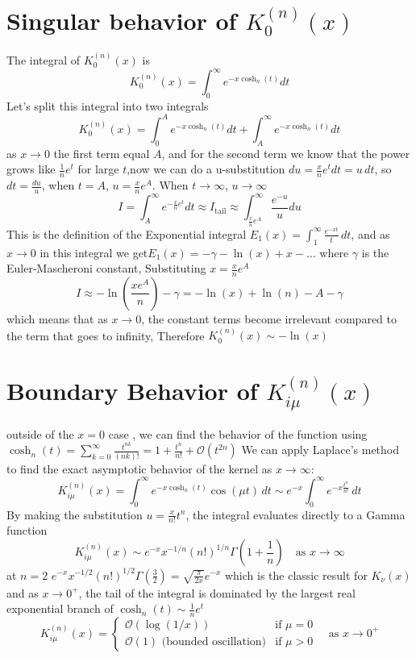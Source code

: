 \documentclass{article}
\newcommand{\NotDefinedcosh}[2]{\operatorname{cosh}_{#1}\text{#2}}
\begin{document}
\section{Singular behavior of $K_0^{(n)}(x)$}
The integral of $K^{(n)}_{0}(x)$ is
\[K^{(n)}_{0}(x) = \int_{0}^{\infty}e^{-x\NotDefinedcosh{n}{}(t)}dt\]
Let's split this integral into two integrals
\[K^{(n)}_{0}(x) = \int_{0}^{A}e^{-x\NotDefinedcosh{n}{}(t)}dt+\int_{A}^{\infty}e^{-x\NotDefinedcosh{n}{}(t)}dt\]
as $x\to 0$ the first term equal $A$, and for the second term we know that the power grows like $\frac{1}{n}e^t$ for large $t$,now we can do a u-substitution $du = \frac{x}{n} e^t dt = u \, dt$, so $dt = \frac{du}{u}$, when $t=A$, $u = \frac{x}{n} e^A$. When $t \to \infty$, $u \to \infty$
\[I = \int_{A}^{\infty}e^{-\frac{x}{n}e^t}dt \approx {I}_{\text{tail}} \approx \int_{\frac{x}{n} e^A}^{\infty} \frac{e^{-u}}{u} du\]
This is the definition of the Exponential integral $E_1(x)= \int_1^\infty \frac{e^{-xt}}{t} \, dt$, and as $x\to 0$ in this integral we get$E_1(x) = -\gamma - \ln(x) + x - \dots$ where $\gamma$ is the Euler-Mascheroni constant, Substituting $x = \frac{x}{n} e^A$ 
\[I\approx -\ln\left(\frac{x e^A}{n}\right) - \gamma = -\ln(x) +\ln(n) - A - \gamma\]
which means that as $x \to 0$, the constant terms become irrelevant compared to the term that goes to infinity, Therefore $K_0^{(n)}(x) \sim -\ln(x)$
\section{Boundary Behavior of $K_{i\mu}^{(n)}(x)$}
outside of the $x=0$ case , we can find the behavior of the function using $\NotDefinedcosh{n}{}(t) = \sum_{k=0}^\infty \frac{t^{nk}}{(nk)!} = 1 + \frac{t^n}{n!} + \mathcal{O}(t^{2n})$
We can apply Laplace's method to find the exact asymptotic behavior of the kernel as $x \to \infty$:
\[K_{i\mu}^{(n)}(x) = \int_0^\infty e^{-x \cosh_n(t)} \cos(\mu t) \, dt \sim e^{-x} \int_0^\infty e^{-x \frac{t^n}{n!}} \, dt\]
By making the substitution $u = \frac{x}{n!}t^n$, the integral evaluates directly to a Gamma function
\[K_{i\mu}^{(n)}(x) \sim e^{-x} x^{-1/n} \left(n!\right)^{1/n} \Gamma\left(1 + \frac{1}{n}\right) \quad \text{as } x \to \infty\]
at $n=2$ $e^{-x} x^{-1/2} \left(n!\right)^{1/2} \Gamma\left(\frac{3}{2}\right) = \sqrt{\frac{\pi}{2x}}e^{-x}$ which is the classic result for $K_\nu(x)$
and as $x \to 0^+$, the tail of the integral is dominated by the largest real exponential branch of $\cosh_n(t) \sim \frac{1}{n}e^t$
\[K_{i\mu}^{(n)}(x) = \begin{cases} \mathcal{O}(\log(1/x)) & \text{if } \mu = 0 \\ \mathcal{O}(1) \text{ (bounded oscillation)} & \text{if } \mu > 0 \end{cases} \quad \text{as } x \to 0^+\]
\end{document}
